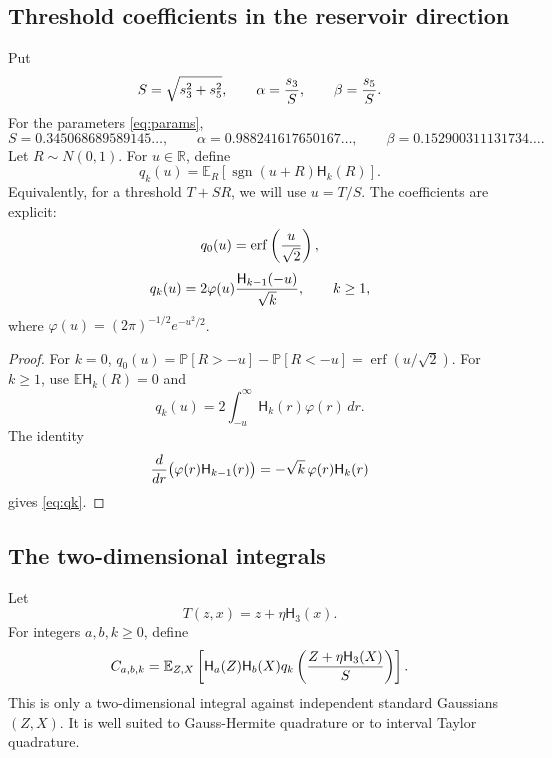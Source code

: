 \documentclass[11pt]{article}
\newcommand{\R}{\mathbb{R}}
\newcommand{\E}{\mathbb{E}}
\newcommand{\Prob}{\mathbb{P}}
\newcommand{\1}{\mathbf{1}}
\newcommand{\sgn}{\operatorname{sgn}}
\newcommand{\Herm}{\mathsf H}
\newcommand{\erf}{\operatorname{erf}}
\begin{document}
\subsection{Threshold coefficients in the reservoir direction}

Put
\begin{equation}\label{eq:S-alpha-beta}
        S=\sqrt{s_3^2+s_5^2},
        \qquad
        \alpha={s_3\over S},
        \qquad
        \beta={s_5\over S}.
\end{equation}
For the parameters \eqref{eq:params},
\[
        S=0.345068689589145\ldots,
        \qquad
        \alpha=0.988241617650167\ldots,
        \qquad
        \beta=0.152900311131734\ldots.
\]
Let \(R\sim N(0,1)\).  For \(u\in\R\), define
\[
        q_k(u)=\E_R[\sgn(u+R)\Herm_k(R)].
\]
Equivalently, for a threshold \(T+SR\), we will use \(u=T/S\).  The coefficients are explicit:
\begin{equation}\label{eq:q0}
        q_0(u)=\erf\left({u\over\sqrt2}\right),
\end{equation}
\begin{equation}\label{eq:qk}
        q_k(u)=2\varphi(u){\Herm_{k-1}(-u)\over\sqrt{k}},\qquad k\ge1,
\end{equation}
where \(\varphi(u)=(2\pi)^{-1/2}e^{-u^2/2}\).

\begin{proof}
For \(k=0\), \(q_0(u)=\Prob[R>-u]-\Prob[R<-u]=\erf(u/\sqrt2)\).  For \(k\ge1\), use \(\E\Herm_k(R)=0\) and
\[
        q_k(u)=2\int_{-u}^\infty \Herm_k(r)\varphi(r)\,dr.
\]
The identity
\[
        {d\over dr}\bigl(\varphi(r)\Herm_{k-1}(r)\bigr)
        =-\sqrt{k}\,\varphi(r)\Herm_k(r)
\]
gives \eqref{eq:qk}.
\end{proof}

\subsection{The two-dimensional integrals}

Let
\[
        T(z,x)=z+\eta\Herm_3(x).
\]
For integers \(a,b,k\ge0\), define
\begin{equation}\label{eq:C-def}
        C_{a,b,k}
        =\E_{Z,X}\left[
            \Herm_a(Z)\Herm_b(X)
            q_k\left({Z+\eta\Herm_3(X)\over S}\right)
          \right].
\end{equation}
This is only a two-dimensional integral against independent standard Gaussians \((Z,X)\).  It is well suited to Gauss-Hermite quadrature or to interval Taylor quadrature.
\end{document}
